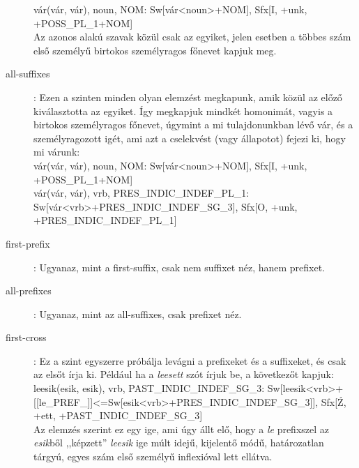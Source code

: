 \documentclass{article}
\begin{document}
\begin{description}
v\'ar(v\'ar, v\'ar), noun, NOM: Sw[v\'ar<noun>+{NOM}], Sfx[I, +unk, +{POSS\_PL\_1}+{NOM}] \\

Az azonos alak\'u szavak k\"oz\"ul csak az egyiket, jelen esetben a t\"obbes sz\'am els\H{o} szem\'ely\H{u} birtokos szem\'elyragos f\H{o}nevet kapjuk meg. \\

\item[all-suffixes]: Ezen a szinten minden olyan elemz\'est megkapunk, amik k\"oz\"ul az el\H{o}z\H{o} kiv\'alasztotta az egyiket. 
\'{I}gy megkapjuk mindk\'et homonim\'at, vagyis a birtokos szem\'elyragos f\H{o}nevet, \'ugymint a mi tulajdonunkban l\'ev\H{o} v\'ar, \'es a szem\'elyragozott ig\'et, ami azt a cselekv\'est (vagy \'allapotot) fejezi ki, hogy mi v\'arunk: \\

v\'ar(v\'ar, v\'ar), noun, NOM: Sw[v\'ar<noun>+{NOM}], Sfx[I, +unk, +{POSS\_PL\_1}+{NOM}] \\

v\'ar(v\'ar, v\'ar), vrb, PRES\_INDIC\_INDEF\_PL\_1: Sw[v\'ar<vrb>+{PRES\_INDIC\_INDEF\_SG\_3}], Sfx[O, +unk, +{PRES\_INDIC\_INDEF\_PL\_1}] \\

\item[first-prefix]: Ugyanaz, mint a first-suffix, csak nem suffixet n\'ez, hanem prefixet. 

\item[all-prefixes]: Ugyanaz, mint az all-suffixes, csak prefixet n\'ez. 

\item[first-cross]: Ez a szint egyszerre pr\'ob\'alja lev\'agni a prefixeket \'es a suffixeket, \'es csak az els\H{o}t \'{i}rja ki. P\'eld\'aul ha a \textit{leesett} sz\'ot \'{i}rjuk be, a k\"ovetkez\H{o}t kapjuk: \\

leesik(esik, esik), vrb, PAST\_INDIC\_INDEF\_SG\_3: Sw[leesik<vrb>+[[le\_PREF\_]]<=Sw[esik<vrb>+{PRES\_INDIC\_INDEF\_SG\_3}]], Sfx[Ź, +ett, +{PAST\_INDIC\_INDEF\_SG\_3}] \\

Az elemz\'es szerint ez egy ige, ami \'ugy \'allt el\H{o}, hogy a \textit{le} prefixszel az \textit{esik}b\H{o}l ,,k\'epzett'' \textit{leesik} ige m\'ult idej\H{u}, kijelent\H{o} m\'od\H{u}, hat\'arozatlan t\'argy\'u, egyes sz\'am els\H{o} szem\'ely\H{u} inflexi\'oval lett ell\'atva. \\


\end{description}
\end{document}
